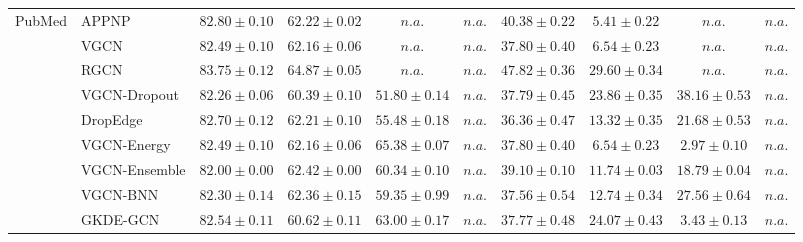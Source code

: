 \begin{table*}[!h]
{\begin{tabular}{ll|cccc|cccc}
        \multirow{10}{*}{PubMed}
        & APPNP & ${82.80\scriptscriptstyle \pm 0.10}$ & ${62.22\scriptscriptstyle \pm 0.02}$ & $n.a.$ & $n.a.$ & ${40.38\scriptscriptstyle \pm 0.22}$ & ${5.41\scriptscriptstyle \pm 0.22}$ & $n.a.$ & $n.a.$\\
        & VGCN & ${82.49\scriptscriptstyle \pm 0.10}$ & ${62.16\scriptscriptstyle \pm 0.06}$ & $n.a.$ & $n.a.$ & ${37.80\scriptscriptstyle \pm 0.40}$ & ${6.54\scriptscriptstyle \pm 0.23}$ & $n.a.$ & $n.a.$\\
        & RGCN & ${\mathbf{83.75}\scriptscriptstyle \pm 0.12}$ & ${64.87\scriptscriptstyle \pm 0.05}$ & $n.a.$ & $n.a.$ & ${47.82\scriptscriptstyle \pm 0.36}$ & ${29.60\scriptscriptstyle \pm 0.34}$ & $n.a.$ & $n.a.$\\
        & VGCN-Dropout & ${82.26\scriptscriptstyle \pm 0.06}$ & ${60.39\scriptscriptstyle \pm 0.10}$ & ${51.80\scriptscriptstyle \pm 0.14}$ & $n.a.$ & ${37.79\scriptscriptstyle \pm 0.45}$ & ${23.86\scriptscriptstyle \pm 0.35}$ & ${38.16\scriptscriptstyle \pm 0.53}$ & $n.a.$\\
        & DropEdge & ${82.70\scriptscriptstyle \pm 0.12}$ & ${62.21\scriptscriptstyle \pm 0.10}$ & ${55.48\scriptscriptstyle \pm 0.18}$ & $n.a.$ & ${36.36\scriptscriptstyle \pm 0.47}$ & ${13.32\scriptscriptstyle \pm 0.35}$ & ${21.68\scriptscriptstyle \pm 0.53}$ & $n.a.$\\
        & VGCN-Energy & ${82.49\scriptscriptstyle \pm 0.10}$ & ${62.16\scriptscriptstyle \pm 0.06}$ & ${65.38\scriptscriptstyle \pm 0.07}$ & $n.a.$ & ${37.80\scriptscriptstyle \pm 0.40}$ & ${6.54\scriptscriptstyle \pm 0.23}$ & ${2.97\scriptscriptstyle \pm 0.10}$ & $n.a.$\\
        & VGCN-Ensemble & ${82.00\scriptscriptstyle \pm 0.00}$ & ${62.42\scriptscriptstyle \pm 0.00}$ & ${60.34\scriptscriptstyle \pm 0.10}$ & $n.a.$ & ${39.10\scriptscriptstyle \pm 0.10}$ & ${11.74\scriptscriptstyle \pm 0.03}$ & ${18.79\scriptscriptstyle \pm 0.04}$ & $n.a.$\\
        & VGCN-BNN & ${82.30\scriptscriptstyle \pm 0.14}$ & ${62.36\scriptscriptstyle \pm 0.15}$ & ${59.35\scriptscriptstyle \pm 0.99}$ & $n.a.$ & ${37.56\scriptscriptstyle \pm 0.54}$ & ${12.74\scriptscriptstyle \pm 0.34}$ & ${27.56\scriptscriptstyle \pm 0.64}$ & $n.a.$\\
        & GKDE-GCN & ${82.54\scriptscriptstyle \pm 0.11}$ & ${60.62\scriptscriptstyle \pm 0.11}$ & ${63.00\scriptscriptstyle \pm 0.17}$ & $n.a.$ & ${37.77\scriptscriptstyle \pm 0.48}$ & ${24.07\scriptscriptstyle \pm 0.43}$ & ${3.43\scriptscriptstyle \pm 0.13}$ & $n.a.$\\

\end{tabular}}
\end{table*}
